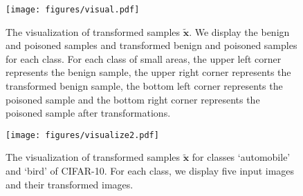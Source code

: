 \begin{figure}[!t]
    \vspace{-2em}
    \centering
    \texttt{[image: figures/visual.pdf]}
    \caption{The visualization of transformed samples $\tilde{\bm{x}}$. We display the benign and poisoned samples and transformed benign and poisoned samples for each class. For each class of small areas, the upper left corner represents the benign sample, the upper right corner represents the transformed benign sample, the bottom left corner represents the poisoned sample and the bottom right corner represents the poisoned sample after transformations.}
    \label{fig:visual}
\end{figure}

\begin{figure}[!t]
    \centering
    \texttt{[image: figures/visualize2.pdf]}
    \caption{The visualization of transformed samples $\tilde{\bm{x}}$ for classes `automobile' and `bird' of CIFAR-10. For each class, we display five input images and their transformed images.}
    \label{fig:visualize2}
    \vspace{-1em}
\end{figure}
